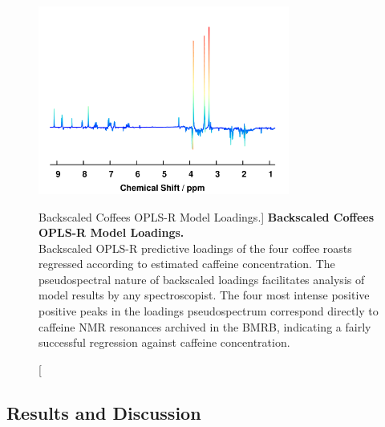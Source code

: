 \begin{figure}
\includegraphics[width=3.25in]{figs/apps/04-oplsr-p.png}
\caption
      [Backscaled Coffees OPLS-R Model Loadings.]{
  {\bf Backscaled Coffees OPLS-R Model Loadings.}
  \\
  Backscaled OPLS-R predictive loadings of the four coffee roasts regressed
  according to estimated caffeine concentration. The pseudospectral nature of
  backscaled loadings facilitates analysis of model results by any
  spectroscopist. The four most intense positive positive peaks in the
  loadings pseudospectrum correspond directly to caffeine NMR resonances
  archived in the BMRB, indicating a fairly successful regression against
  caffeine concentration.
}
\label{figure.4.4}
\end{figure}

\subsection{Results and Discussion}

